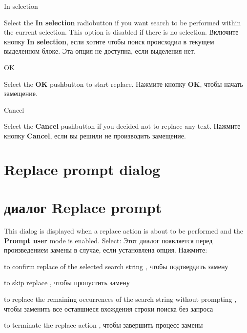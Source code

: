 \begin{popup}
\caption{In selection}

\ifenglish
Select the {\bf In selection} radiobutton if you want search to be performed
within the current selection. This option is disabled if there is no selection.
\else
Включите кнопку {\bf In selection}, если хотите чтобы поиск происходил в текущем 
выделенном блоке. Эта опция не доступна, если выделения нет.
\fi
\end{popup}

\begin{popup}
\caption{OK}

\ifenglish
Select the {\bf OK} pushbutton to start replace.
\else
Нажмите кнопку {\bf OK}, чтобы начать замещение.
\fi
\end{popup}

\begin{popup}
\caption{Cancel}

\ifenglish
Select the {\bf Cancel} pushbutton if you decided not to replace any text.
\else
Нажмите кнопку {\bf Cancel}, если вы решили не производить замещение.
\fi
\end{popup}


\ifenglish
\section{Replace prompt dialog}
\else
\section{диалог Replace prompt}
\fi
{}

\ifenglish
This dialog is displayed when a replace action is about to be performed
and the {\bf Prompt user} mode is enabled. Select:
\else
Этот диалог появляется перед произведением замены в случае, если установлена
опция. Нажмите: 
\fi
\begin{description}
\item \ifenglish
      [{\bf Yes}] to confirm replace of the selected search string
      \else
      [{\bf Yes}], чтобы подтвердить замену        
      \fi
\item \ifenglish
     [{\bf No}] to skip replace
     \else
     [{\bf No}], чтобы пропустить замену
     \fi
\item {} to replace the remaining occurrences of the
   search string without prompting
     , чтобы заменить все оставшиеся вхождения
     строки поиска без запроса
     \fi
\item \ifenglish
      [{\bf Cancel}] to terminate the replace action
     \else
     [{\bf Cancel}], чтобы завершить процесс замены
     \fi
\end{description}

